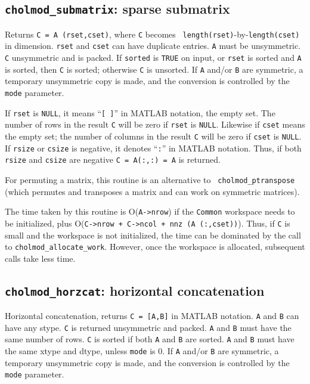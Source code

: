 \documentclass[11pt]{article}
\begin{document}
\subsection{{\tt cholmod\_submatrix}: sparse submatrix}


Returns {\tt C = A (rset,cset)}, where {\tt C} becomes {\tt
length(rset)}-by-{\tt length(cset)} in dimension.  {\tt rset} and {\tt cset}
can have duplicate entries.  {\tt A} must be unsymmetric.  {\tt C} unsymmetric
and is packed.  If {\tt sorted} is {\tt TRUE} on input, or {\tt rset} is sorted
and {\tt A} is sorted, then {\tt C} is sorted; otherwise {\tt C} is unsorted.
%
If \verb'A' and/or \verb'B' are symmetric, a temporary unsymmetric copy is
made, and the conversion is controlled by the \verb'mode' parameter.

If {\tt rset} is {\tt NULL}, it means ``{\tt [ ]}'' in MATLAB notation, the
empty set.  The number of rows in the result {\tt C} will be zero if {\tt rset}
is {\tt NULL}.  Likewise if {\tt cset} means the empty set; the number of
columns in the result {\tt C} will be zero if {\tt cset} is {\tt NULL}.  If
{\tt rsize} or {\tt csize} is negative, it denotes ``{\tt :}'' in MATLAB
notation.  Thus, if both {\tt rsize} and {\tt csize} are negative {\tt C =
A(:,:) = A} is returned.

For permuting a matrix, this routine is an alternative to {\tt
cholmod\_ptranspose} (which permutes and transposes a matrix and can work on
symmetric matrices).

The time taken by this routine is O({\tt A->nrow}) if the {\tt Common}
workspace needs to be initialized, plus O({\tt C->nrow + C->ncol + nnz (A
(:,cset))}).  Thus, if {\tt C} is small and the workspace is not initialized,
the time can be dominated by the call to {\tt cholmod\_allocate\_work}.
However, once the workspace is allocated, subsequent calls take less time.

\subsection{{\tt cholmod\_horzcat}: horizontal concatenation}


Horizontal concatenation, returns {\tt C = [A,B]} in MATLAB notation.  {\tt A}
and {\tt B} can have any stype.  {\tt C} is returned unsymmetric and packed.
{\tt A} and {\tt B} must have the same number of rows.  {\tt C} is sorted if
both {\tt A} and {\tt B} are sorted.  {\tt A} and {\tt B} must have the same
xtype and dtype, unless {\tt mode} is 0.
%
If \verb'A' and/or \verb'B' are symmetric, a temporary unsymmetric copy is
made, and the conversion is controlled by the \verb'mode' parameter.
\end{document}
